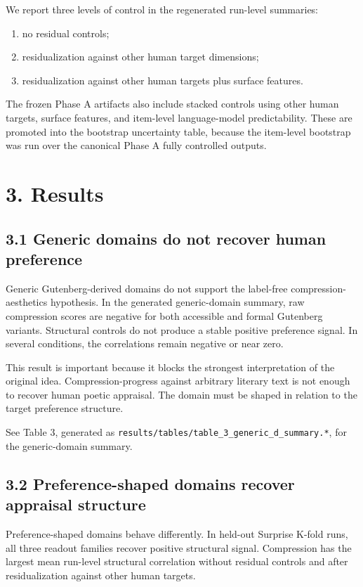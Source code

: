 \documentclass[11pt]{article}
\begin{document}
We report three levels of control in the regenerated run-level summaries:

\begin{enumerate}
\item no residual controls;
\item residualization against other human target dimensions;
\item residualization against other human targets plus surface features.
\end{enumerate}

The frozen Phase A artifacts also include stacked controls using other human targets, surface features, and item-level language-model predictability. These are promoted into the bootstrap uncertainty table, because the item-level bootstrap was run over the canonical Phase A fully controlled outputs.

\section{3. Results}

\subsection{3.1 Generic domains do not recover human preference}

Generic Gutenberg-derived domains do not support the label-free compression-aesthetics hypothesis. In the generated generic-domain summary, raw compression scores are negative for both accessible and formal Gutenberg variants. Structural controls do not produce a stable positive preference signal. In several conditions, the correlations remain negative or near zero.

This result is important because it blocks the strongest interpretation of the original idea. Compression-progress against arbitrary literary text is not enough to recover human poetic appraisal. The domain must be shaped in relation to the target preference structure.

See Table 3, generated as \texttt{results/tables/table\_3\_generic\_d\_summary.*}, for the generic-domain summary.

\subsection{3.2 Preference-shaped domains recover appraisal structure}

Preference-shaped domains behave differently. In held-out Surprise K-fold runs, all three readout families recover positive structural signal. Compression has the largest mean run-level structural correlation without residual controls and after residualization against other human targets.
\end{document}
